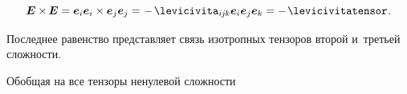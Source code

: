 \begin{otherlanguage}{russian}
%
%
%
\vspace{-0.32em}\begin{equation}\label{iso:twothree}
\UnitDyad \times \hspace{-0.16ex} \UnitDyad = \bm{e}_i \bm{e}_i \times \bm{e}_j \bm{e}_j = \hspace{-0.4ex} \tikzmark{BeginECrossE} - \hspace{-0.2ex} \levicivita_{i\hspace{-0.1ex}j\hspace{-0.1ex}k} \bm{e}_i \bm{e}_j \bm{e}_k \tikzmark{EndECrossE} = - \hspace{.2ex} \levicivitatensor
\hspace{.1ex} .
\end{equation}
%

\vspace{-0.5em}\noindent
Последнее равенство представляет связь изотропных тензоров второй и~третьей сложности.

Обобщая на все тензоры ненулевой сложности


\end{otherlanguage}
